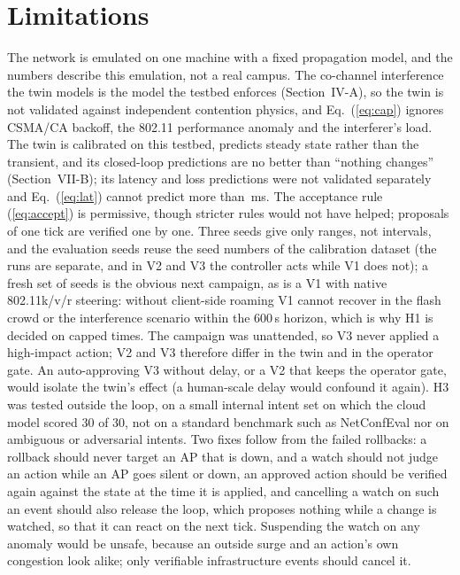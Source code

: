 \documentclass[conference]{IEEEtran}
\begin{document}
\section{Limitations}
The network is emulated on one machine with a fixed propagation model, and the numbers describe this emulation, not a real campus. The co-channel interference the twin models is the model the testbed enforces (Section~IV-A), so the twin is not validated against independent contention physics, and Eq.~(\ref{eq:cap}) ignores CSMA/CA backoff, the 802.11 performance anomaly and the interferer's load. The twin is calibrated on this testbed, predicts steady state rather than the transient, and its closed-loop predictions are no better than ``nothing changes'' (Section~VII-B); its latency and loss predictions were not validated separately and Eq.~(\ref{eq:lat}) cannot predict more than \CfgLatCap\,ms. The acceptance rule (\ref{eq:accept}) is permissive, though stricter rules would not have helped; proposals of one tick are verified one by one. Three seeds give only ranges, not intervals, and the evaluation seeds reuse the seed numbers of the calibration dataset (the runs are separate, and in V2 and V3 the controller acts while V1 does not); a fresh set of seeds is the obvious next campaign, as is a V1 with native 802.11k/v/r steering: without client-side roaming V1 cannot recover in the flash crowd or the interference scenario within the 600\,s horizon, which is why H1 is decided on capped times. The campaign was unattended, so V3 never applied a high-impact action; V2 and V3 therefore differ in the twin and in the operator gate. An auto-approving V3 without delay, or a V2 that keeps the operator gate, would isolate the twin's effect (a human-scale delay would confound it again). H3 was tested outside the loop, on a small internal intent set on which the cloud model scored 30 of 30, not on a standard benchmark such as NetConfEval nor on ambiguous or adversarial intents. Two fixes follow from the failed rollbacks: a rollback should never target an AP that is down, and a watch should not judge an action while an AP goes silent or down, an approved action should be verified again against the state at the time it is applied, and cancelling a watch on such an event should also release the loop, which proposes nothing while a change is watched, so that it can react on the next tick. Suspending the watch on any anomaly would be unsafe, because an outside surge and an action's own congestion look alike; only verifiable infrastructure events should cancel it.
\end{document}
